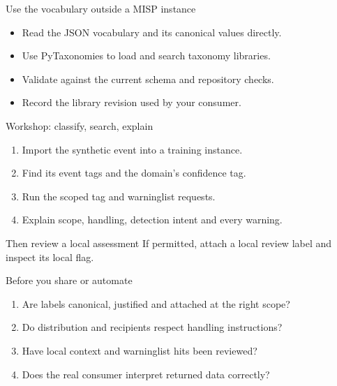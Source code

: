 \begin{frame}{Use the vocabulary outside a MISP instance}
    \begin{itemize}
        \item Read the JSON vocabulary and its canonical values directly.
        \item Use PyTaxonomies to load and search taxonomy libraries.
        \item Validate against the current schema and repository checks.
        \item Record the library revision used by your consumer.
    \end{itemize}
\end{frame}

\begin{frame}{Workshop: classify, search, explain}
    \begin{enumerate}
        \item Import the synthetic event into a training instance.
        \item Find its event tags and the domain's confidence tag.
        \item Run the scoped tag and warninglist requests.
        \item Explain scope, handling, detection intent and every warning.
    \end{enumerate}
    \begin{block}{Then review a local assessment}
        If permitted, attach a local review label and inspect its local flag.
    \end{block}
\end{frame}

\begin{frame}{Before you share or automate}
    \begin{enumerate}
        \item Are labels canonical, justified and attached at the right scope?
        \item Do distribution and recipients respect handling instructions?
        \item Have local context and warninglist hits been reviewed?
        \item Does the real consumer interpret returned data correctly?
    \end{enumerate}
\end{frame}

